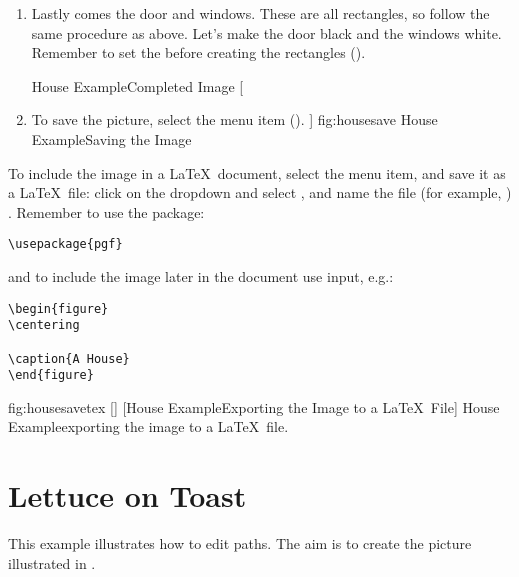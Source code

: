 \begin{enumerate}
[]
{
 {fig:house2a}{}{},
 {fig:house2b}{}{}
}
[House Example\dash Creating a Triangle]
{House Example\dash creating a triangle:
 triangle under construction,
 completed triangle.}

\item Lastly comes the door and windows. These are all
rectangles, so follow the same procedure as above.
Let's make the door black and the windows white.
Remember to set the  before creating the rectangles
().

{}
{House Example\dash Completed Image}
[
\item To save the picture, select the 
menu item ().
]
{fig:housesave}
{}
{House Example\dash Saving the Image}

\end{enumerate}

To include the image in a \LaTeX\ document, select the
 menu item, and save it as a
\LaTeX\ file: click on the  \gls{dropdown} and
select , and name the file
(for example, )
. Remember to use the  package:
\begin{verbatim}
\usepackage{pgf}
\end{verbatim}
and to include the image later in the document use \gls{input}, e.g.:
\begin{verbatim}
\begin{figure}
\centering

\caption{A House}
\end{figure}
\end{verbatim}

\FloatFig
{fig:housesavetex}
[]
{}
[House Example\dash Exporting the Image to a \LaTeX\ File]
{House Example\dash exporting the image to a \LaTeX\ file.}

\section{Lettuce on Toast}\label{sec:toastexample}

This example illustrates how to edit paths. The aim is to create
the picture illustrated in .

